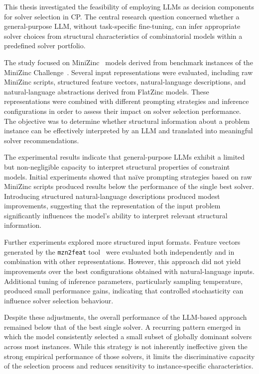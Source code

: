 \documentclass[../../main]{subfiles}
\begin{document}
This thesis investigated the feasibility of employing LLMs as decision components for solver selection in CP. The central research question concerned whether a general-purpose LLM, without task-specific fine-tuning, can infer appropriate solver choices from structural characteristics of combinatorial models within a predefined solver portfolio.

The study focused on MiniZinc~\cite{MiniZinc} models derived from benchmark instances of the MiniZinc Challenge~\cite{MznProblems}. Several input representations were evaluated, including raw MiniZinc scripts, structured feature vectors, natural-language descriptions, and natural-language abstractions derived from FlatZinc models. These representations were combined with different prompting strategies and inference configurations in order to assess their impact on solver selection performance. The objective was to determine whether structural information about a problem instance can be effectively interpreted by an LLM and translated into meaningful solver recommendations.

The experimental results indicate that general-purpose LLMs exhibit a limited but non-negligible capacity to interpret structural properties of constraint models. Initial experiments showed that na\"ive prompting strategies based on raw MiniZinc scripts produced results below the performance of the single best solver. Introducing structured natural-language descriptions produced modest improvements, suggesting that the representation of the input problem significantly influences the model's ability to interpret relevant structural information.

Further experiments explored more structured input formats. Feature vectors generated by the \texttt{mzn2feat} tool~\cite{mzn2feat} were evaluated both independently and in combination with other representations. However, this approach did not yield improvements over the best configurations obtained with natural-language inputs. Additional tuning of inference parameters, particularly sampling temperature, produced small performance gains, indicating that controlled stochasticity can influence solver selection behaviour.

Despite these adjustments, the overall performance of the LLM-based approach remained below that of the best single solver. A recurring pattern emerged in which the model consistently selected a small subset of globally dominant solvers across most instances. While this strategy is not inherently ineffective given the strong empirical performance of those solvers, it limits the discriminative capacity of the selection process and reduces sensitivity to instance-specific characteristics.
\end{document}

